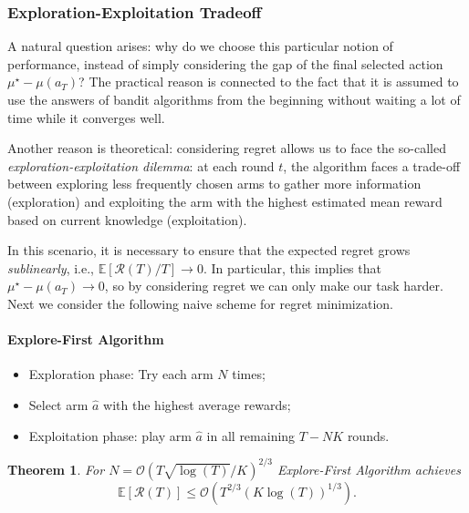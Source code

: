 \documentclass{article}
\numberwithin{equation}{section}
\newtheorem{theorem}{Theorem}
\newcommand{\E}{\mathbb E}
\begin{document}
\subsubsection{Exploration-Exploitation Tradeoff}

A natural question arises: why do we choose this particular notion of performance, instead of simply considering the gap of the final selected action $\mu^\star - \mu(a_T)$? The practical reason is connected to the fact that it is assumed to use the answers of bandit algorithms from the beginning without waiting a lot of time while it converges well.

Another reason is theoretical: considering regret allows us to face the so-called \textit{exploration-exploitation dilemma}: at each round $t$, the algorithm faces a trade-off between exploring less frequently chosen arms to gather more information (exploration) and exploiting the arm with the highest estimated mean reward based on current knowledge (exploitation).

In this scenario, it is necessary to ensure that the expected regret grows \textit{sublinearly}, i.e., $\E[\mathcal{R}(T)/T] \to 0$. In particular, this implies that $\mu^\star - \mu(a_T) \to 0$, so by considering regret we can only make our task harder. Next we consider the following naive scheme for regret minimization.

\paragraph{Explore-First Algorithm}
\begin{itemize}
    \item Exploration phase: Try each arm $N$ times;
    \item Select arm $\hat a$ with the highest average rewards;
    \item Exploitation phase: play arm $\hat a$ in all remaining $T - NK$ rounds.
\end{itemize}

\begin{theorem}\label{th:explore_first_regret}
    For $N=\mathcal{O}(T\sqrt{\log(T)}/K)^{2/3}$ Explore-First Algorithm achieves 
    \[
        \E[\mathcal{R}(T)]  \leq \mathcal{O}\left( T^{2/3} (K \log (T))^{1/3} \right).
    \]
\end{theorem}
\end{document}
